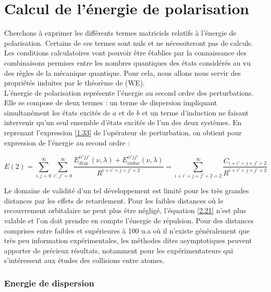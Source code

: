 \chapter{Calcul de l'énergie de polarisation}
\minitoc
\restoregeometry

\newpage

Cherchons à exprimer les différents termes matriciels relatifs à l'énergie de polarisation. Certains de ces termes sont nuls et ne nécessiteront pas de calculs. Les conditions calculatoires vont pouvoir être établies par la connaissance des combinaisons permises entre les nombres quantiques des états considérés au vu des règles de la mécanique quantique. Pour cela, nous allons nous servir des propriétés induites par le théorème de (WE).\\

L'énergie de polarisation représente l'énergie au second ordre des perturbations. Elle se compose de deux termes : un terme de dispersion impliquant simultanément les états excités de $a$ et de $b$ et un terme d'induction ne faisant intervenir qu'un seul ensemble d'états excités de l'un des deux systèmes. En reprenant l'expression \ref{1.33} de l'opérateur de perturbation, on obtient pour expression de l'énergie au second ordre : 

\begin{equation}
E(2) = \sum_{i,j=0}^{\infty} \sum_{i',j'=0}^{\infty} \frac{E_{disp}^{ii'jj'} (\nu , \lambda) + E_{induc}^{ii'jj'}(\nu , \lambda)}{R^{i+i'+j+j'+2}} = \sum_{i+i'+j+j'+2=2}^{\infty} \frac{C_{i+i'+j+j'+2}}{R^{i+i'+j+j'+2}} \label{2.21}
\end{equation}

Le domaine de validité d'un tel développement est limité pour les très grandes distances par les effets de retardement. Pour les faibles distances où le recouvrement orbitalaire ne peut plus être négligé, l'équation \ref{2.21} n'est plus valable et l'on doit prendre en compte l'énergie de répulsion. Pour des distances comprises entre faibles et supérieures à 100 u.a où il n'existe généralement que très peu information expérimentales, les méthodes dites asymptotiques peuvent apporter de précieux résultats, notamment pour les expérimentateurs qui s'intéressent aux études des collisions entre atomes. 

\subsection{Energie de dispersion}

